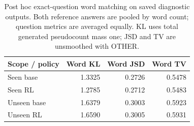 \begin{table}[htbp]
\centering\small
\caption{Post hoc exact-question word matching on saved diagnostic outputs. Both reference answers are pooled by word count; question metrics are averaged equally. KL uses total generated pseudocount mass one; JSD and TV are unsmoothed with OTHER.}\label{tab:word-audit-new}
\begin{tabular}{@{}lrrr@{}}
\toprule
Scope / policy & Word KL & Word JSD & Word TV\\
\midrule
Seen base & 1.3325 & 0.2726 & 0.5478\\
Seen RL & 1.2785 & 0.2712 & 0.5483\\
Unseen base & 1.6379 & 0.3003 & 0.5923\\
Unseen RL & 1.6590 & 0.3005 & 0.5931\\
\bottomrule
\end{tabular}
\end{table}
